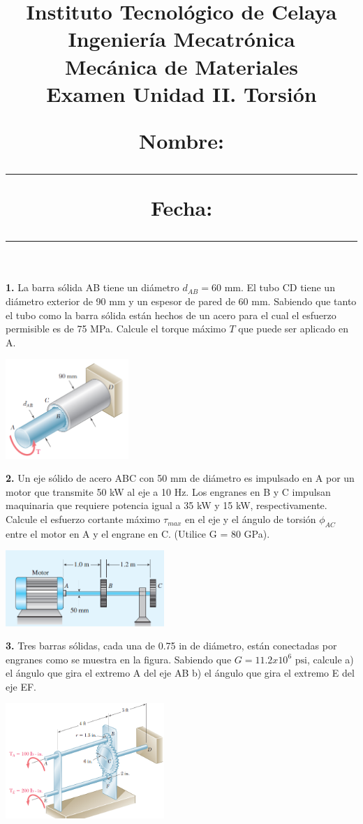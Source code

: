 \documentclass[10pt,letterpaper,twocolumn]{article}
\author{}
\date{}
\title{
\vspace{-20mm}
{\normalsize Instituto Tecnológico de Celaya} \\ [-3.5mm]
{\normalsize Ingeniería Mecatrónica} \\ [-3.5mm]
{\normalsize Mecánica de Materiales} \\ [-3.5mm]
{\bf\normalsize Examen Unidad II. Torsión} \\ [2mm]
{\normalsize Nombre: \rule{8cm}{0.4pt} \hfill Fecha: \rule{3cm}{0.4pt} }
}
\newcommand{\puntos}[1]{ {\small\sffamily [#1 \%]} }
\begin{document}
\maketitle
\vspace{-20mm}
\textbf{1.} La barra sólida AB tiene un diámetro $d_{AB} = 60 \text{ mm}$. El tubo CD tiene un diámetro 
exterior de 90 mm y un espesor de pared de 60 mm. Sabiendo que tanto el tubo como la barra sólida están hechos 
de un acero para el cual el esfuerzo permisible es de 75 MPa. Calcule el torque máximo $T$ que puede ser 
aplicado en A. \puntos{30}

\begin{center}
\includegraphics[width=0.35\textwidth]{img/p1.PNG}
\end{center}


\textbf{2.} Un eje sólido de acero ABC con 50 mm de diámetro es impulsado en
A por un motor que transmite 50 kW al eje a 10 Hz. Los engranes en B y C impulsan
maquinaria que requiere potencia igual a 35 kW y 15 kW, respectivamente.
Calcule el esfuerzo cortante máximo $\tau_{max}$ en el eje y el ángulo de torsión $\phi_{AC}$
entre el motor en A y el engrane en C. (Utilice G = 80 GPa). \puntos{30}

\begin{center}
\includegraphics[width=0.45\textwidth]{img/p2.PNG}
\end{center}

\textbf{3.} Tres barras sólidas, cada una de 0.75 in de diámetro, están conectadas por engranes como 
se muestra en la figura. Sabiendo que $G=11.2x10^6 \text{ psi}$, calcule a) el ángulo que gira el extremo 
A del eje AB b) el ángulo que gira el extremo E del eje EF. \puntos{30}

\begin{center}
\includegraphics[width=0.45\textwidth]{img/p3.PNG}
\end{center}
\end{document}
